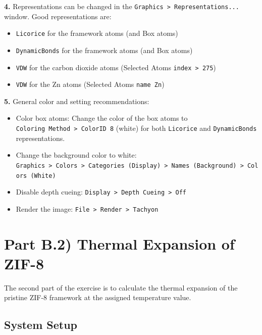 \documentclass[
  letterpaper,
]{article}
\providecommand{\tightlist}{%
  \setlength{\itemsep}{0pt}\setlength{\parskip}{0pt}}\usepackage{longtable,booktabs,array}
\begin{document}
\textbf{4.} Representations can be changed in the
\texttt{Graphics\ \textgreater{}\ Representations...} window. Good
representations are:

\begin{itemize}
\tightlist
\item
  \texttt{Licorice} for the framework atoms (and Box atoms)
\item
  \texttt{DynamicBonds} for the framework atoms (and Box atoms)
\item
  \texttt{VDW} for the carbon dioxide atoms (Selected Atoms
  \texttt{index\ \textgreater{}\ 275})
\item
  \texttt{VDW} for the Zn atoms (Selected Atoms \texttt{name\ Zn})
\end{itemize}

\textbf{5.} General color and setting recommendations:

\begin{itemize}
\tightlist
\item
  Color box atoms: Change the color of the box atoms to
  \texttt{Coloring\ Method\ \textgreater{}\ ColorID\ 8} (white) for both
  \texttt{Licorice} and \texttt{DynamicBonds} representations.
\item
  Change the background color to white:
  \texttt{Graphics\ \textgreater{}\ Colors\ \textgreater{}\ Categories\ (Display)\ \textgreater{}\ Names\ (Background)\ \textgreater{}\ Colors\ (White)}
\item
  Disable depth cueing:
  \texttt{Display\ \textgreater{}\ Depth\ Cueing\ \textgreater{}\ Off}
\item
  Render the image:
  \texttt{File\ \textgreater{}\ Render\ \textgreater{}\ Tachyon}
\end{itemize}

\hypertarget{part-b.2-thermal-expansion-of-zif-8}{%
\section{Part B.2) Thermal Expansion of
ZIF-8}\label{part-b.2-thermal-expansion-of-zif-8}}

The second part of the exercise is to calculate the thermal expansion of
the pristine ZIF-8 framework at the assigned temperature value.

\hypertarget{system-setup-1}{%
\subsection*{System Setup}\label{system-setup-1}}
\end{document}
